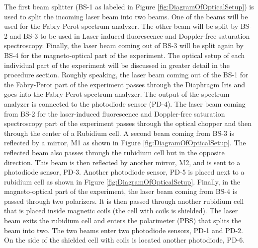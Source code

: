 \documentclass{../lab}
\begin{document}
\newpage

The first beam splitter (BS-1 as labeled in Figure \ref{fig:DiagramOfOpticalSetup}) is used to split the incoming laser beam into two beams. One of the beams will be used for the Fabry-Perot spectrum analyzer. The other beam will be split by BS-2 and BS-3 to be used in Laser induced fluorescence and Doppler-free saturation spectroscopy. Finally, the laser beam coming out of BS-3 will be split again by BS-4 for the magneto-optical part of the experiment. The optical setup of each individual part of the experiment will be discussed in greater detail in the procedure section. Roughly speaking, the laser beam coming out of the BS-1 for the Fabry-Perot part of the experiment passes through the Diaphragm Iris and goes into the Fabry-Perot spectrum analyzer. The output of the spectrum analyzer is connected to the photodiode sensor (PD-4). The laser beam coming from BS-2 for the laser-induced fluorescence and Doppler-free saturation spectroscopy part of the experiment passes through the optical chopper and then through the center of a Rubidium cell. A second beam coming from BS-3 is reflected by a mirror, M1 as shown in Figure \ref{fig:DiagramOfOpticalSetup}. The reflected beam also passes through the rubidium cell but in the opposite direction. This beam is then reflected by another mirror, M2, and is sent to a photodiode sensor, PD-3. Another photodiode sensor, PD-5 is placed next to a rubidium cell as shown in Figure \ref{fig:DiagramOfOpticalSetup}. Finally, in the magneto-optical part of the experiment, the laser beam coming from BS-4 is passed through two polarizers. It is then passed through another rubidium cell that is placed inside magnetic coils (the cell with coils is shielded). The laser beam exits the rubidium cell and enters the polarimeter (PBS) that splits the beam into two. The two beams enter two photodiode sensors, PD-1 and PD-2. On the side of the shielded cell with coils is located another photodiode, PD-6.


\end{document}
